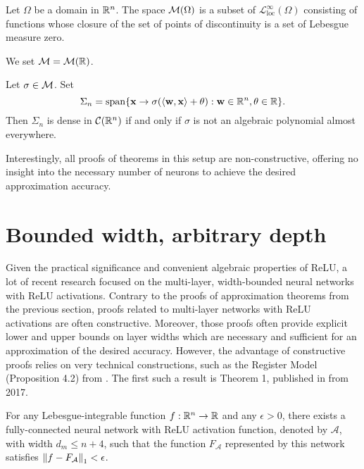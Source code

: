 \begin{definition}
Let $\Omega$ be a domain in ${\mathbb R}^n$. The space ${\mathcal M}(\Omega)$ is a subset of $\mathcal{L}_{\operatorname{loc}}^\infty(\Omega)$ consisting of functions whose closure of the set of points of discontinuity is a set of Lebesgue measure zero. 
\end{definition}
\begin{remark}
We set ${\mathcal M} = {\mathcal M}({\mathbb R})$.
\end{remark}
\begin{theorem}
Let $\sigma \in {\mathcal M}$. Set \[
\Sigma_{n} = \operatorname{span} \{\mathbf{x} \to \sigma(\langle \mathbf{w}, \mathbf{x} \rangle + \theta) : \mathbf{w} \in {\mathbb R}^n, \theta \in {\mathbb R} \}.
\]
Then $\Sigma_{n}$ is dense in ${\mathcal C}({\mathbb R}^n)$ if and only if $\sigma$ is not an algebraic polynomial almost everywhere.
\end{theorem}
Interestingly, all proofs of theorems in this setup are non-constructive, offering no insight into the necessary number of neurons to achieve the desired approximation accuracy.
\section{Bounded width, arbitrary depth}
\label{section:literature-review:bounded_width}

Given the practical significance and convenient algebraic properties of ReLU, a lot of recent research focused on the multi-layer, width-bounded neural networks with ReLU activations. Contrary to the proofs of approximation theorems from the previous section, proofs related to multi-layer networks with ReLU activations are often constructive. Moreover, those proofs often provide explicit lower and upper bounds on layer widths which are necessary and sufficient for an approximation of the desired accuracy. However, the advantage of constructive proofs relies on very technical constructions, such as the Register Model (Proposition 4.2) from \cite{kidger_2020_universal}. 
The first such a result is Theorem 1, published in \cite{lu} from 2017.

\begin{theorem}
For any Lebesgue-integrable function $f : {\mathbb R}^n \to {\mathbb R}$ and any $\epsilon > 0$, there exists a fully-connected neural network with ReLU activation function, denoted by $\mathcal{A}$, with width $d_m \leq n + 4$, such that the function $F_{\mathcal{A}}$ represented by this network satisfies $\left\lVert f - F_{\mathcal{A}}\right\rVert_1 < \epsilon$.
\end{theorem}

